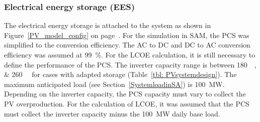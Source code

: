 \subsubsection{Electrical energy storage (EES)}

The electrical energy storage is attached to the system as shown in Figure~\ref{PV_model_config} on page~\pageref{PV_model_config}. For the simulation in SAM, the PCS was simplified to the conversion efficiency. The AC to DC and DC to AC conversion efficiency was assumed at \SI{99}{\percent}. For the LCOE calculation, it is still necessary to define the performance of the PCS. The inverter capacity range is between \SIlist{180;260}{\mega\wattsac} for cases with adapted storage (Table~\ref{tbl: PVsystemdesign}). The maximum anticipated load (see Section~\ref{SystemloadinSA}) is \SI{100}{\mega\watt}. Depending on the inverter capacity, the PCS capacity must vary to collect the  PV overproduction. For the calculation of LCOE, it was assumed that the PCS must collect the inverter capacity minus the \SI{100}{MW} daily base load.


